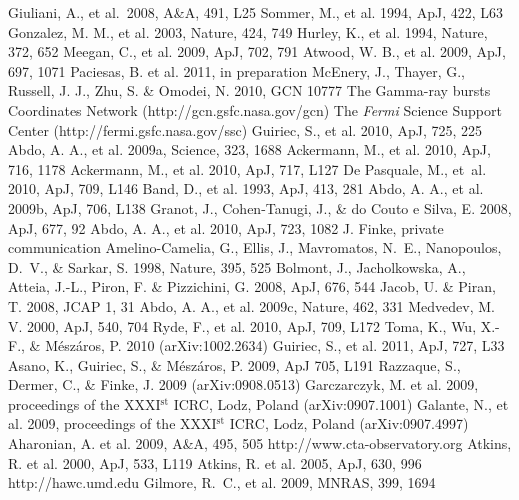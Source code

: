 \begin{thebibliography}{00}


 Giuliani, A., et al.\ 2008, A\&A, 491, L25
 Sommer, M., et al. 1994, ApJ, 422, L63
 Gonzalez, M. M., et al. 2003, Nature, 424, 749
 Hurley, K., et al. 1994, Nature, 372, 652
 Meegan, C., et al. 2009, ApJ, 702, 791
 Atwood, W. B., et al. 2009, ApJ, 697, 1071
 Paciesas, B. et al. 2011, in preparation
 McEnery, J., Thayer, G., Russell, J. J., Zhu, S. \& Omodei, N. 2010, GCN 10777
 The Gamma-ray bursts Coordinates Network (http://gcn.gsfc.nasa.gov/gcn)
 The {\it Fermi} Science Support Center (http://fermi.gsfc.nasa.gov/ssc)
 Guiriec, S., et al. 2010, ApJ, 725, 225
 Abdo, A. A., et al. 2009a, Science, 323, 1688
 Ackermann, M., et al. 2010, ApJ, 716, 1178
 Ackermann, M., et al. 2010, ApJ, 717, L127
 De Pasquale, M., et~al. 2010, ApJ, 709, L146
 Band, D., et al. 1993, ApJ, 413, 281
 Abdo, A. A., et al. 2009b, ApJ, 706, L138
 Granot, J., Cohen-Tanugi, J., \& do Couto e Silva, E. 2008, ApJ, 677, 92
 Abdo, A. A., et al. 2010, ApJ, 723, 1082
 J. Finke, private communication
 Amelino-Camelia, G., Ellis, J., Mavromatos, N.~E., Nanopoulos, D.~V., \& Sarkar, S. 1998, Nature, 395, 525
 Bolmont, J., Jacholkowska, A., Atteia, J.-L., Piron, F. \& Pizzichini, G. 2008, ApJ, 676, 544
 Jacob, U. \& Piran, T. 2008, JCAP 1, 31
 Abdo, A. A., et al. 2009c, Nature, 462, 331
 Medvedev, M. V. 2000, ApJ, 540, 704
 Ryde, F., et al. 2010, ApJ, 709, L172
 Toma, K., Wu, X.-F., \& M\'esz\'aros, P. 2010 (arXiv:1002.2634) 
 Guiriec, S., et al. 2011, ApJ, 727, L33
 Asano, K., Guiriec, S., \& M\'esz\'aros, P. 2009, ApJ 705, L191
 Razzaque, S., Dermer, C., \& Finke, J. 2009 (arXiv:0908.0513)
 Garczarczyk, M. et al. 2009, proceedings of the XXXI$^\mathrm{st}$ ICRC, Lodz, Poland (arXiv:0907.1001)
 Galante, N., et al. 2009, proceedings of the XXXI$^\mathrm{st}$ ICRC, Lodz, Poland (arXiv:0907.4997)
 Aharonian, A. et al. 2009, A\&A, 495, 505
 http://www.cta-observatory.org
 Atkins, R. et al. 2000, ApJ, 533, L119
 Atkins, R. et al. 2005, ApJ, 630, 996
 http://hawc.umd.edu
 Gilmore, R.~C., et al. 2009, MNRAS, 399, 1694

\end{thebibliography}

